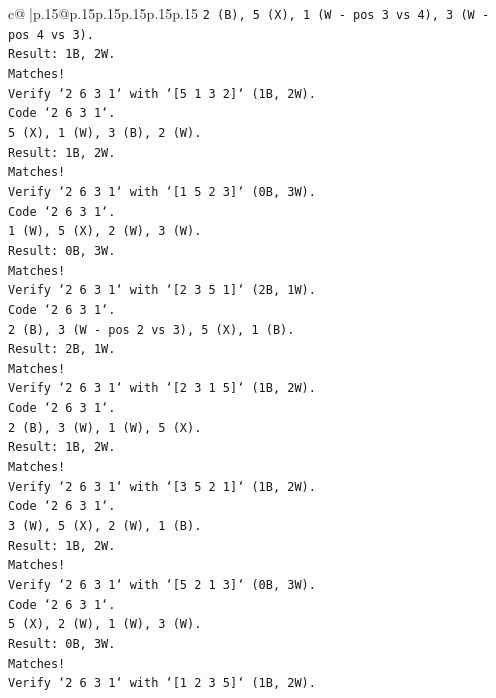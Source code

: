 \documentclass{article}
\begin{document}
{\begin{supertabular}{c@{$\;$}|p{.15\linewidth}@{}p{.15\linewidth}p{.15\linewidth}p{.15\linewidth}p{.15\linewidth}p{.15\linewidth}}
{{{\texttt{2 (B), 5 (X), 1 (W {-} pos 3 vs 4), 3 (W {-} pos 4 vs 3).} \\
\texttt{Result: 1B, 2W.} \\
\texttt{Matches!} \\
\texttt{Verify `2 6 3 1` with `{[}5 1 3 2{]}` (1B, 2W).} \\
\texttt{Code `2 6 3 1`.} \\
\texttt{5 (X), 1 (W), 3 (B), 2 (W).} \\
\texttt{Result: 1B, 2W.} \\
\texttt{Matches!} \\
\texttt{Verify `2 6 3 1` with `{[}1 5 2 3{]}` (0B, 3W).} \\
\texttt{Code `2 6 3 1`.} \\
\texttt{1 (W), 5 (X), 2 (W), 3 (W).} \\
\texttt{Result: 0B, 3W.} \\
\texttt{Matches!} \\
\texttt{Verify `2 6 3 1` with `{[}2 3 5 1{]}` (2B, 1W).} \\
\texttt{Code `2 6 3 1`.} \\
\texttt{2 (B), 3 (W {-} pos 2 vs 3), 5 (X), 1 (B).} \\
\texttt{Result: 2B, 1W.} \\
\texttt{Matches!} \\
\texttt{Verify `2 6 3 1` with `{[}2 3 1 5{]}` (1B, 2W).} \\
\texttt{Code `2 6 3 1`.} \\
\texttt{2 (B), 3 (W), 1 (W), 5 (X).} \\
\texttt{Result: 1B, 2W.} \\
\texttt{Matches!} \\
\texttt{Verify `2 6 3 1` with `{[}3 5 2 1{]}` (1B, 2W).} \\
\texttt{Code `2 6 3 1`.} \\
\texttt{3 (W), 5 (X), 2 (W), 1 (B).} \\
\texttt{Result: 1B, 2W.} \\
\texttt{Matches!} \\
\texttt{Verify `2 6 3 1` with `{[}5 2 1 3{]}` (0B, 3W).} \\
\texttt{Code `2 6 3 1`.} \\
\texttt{5 (X), 2 (W), 1 (W), 3 (W).} \\
\texttt{Result: 0B, 3W.} \\
\texttt{Matches!} \\
\texttt{Verify `2 6 3 1` with `{[}1 2 3 5{]}` (1B, 2W).} \\
}}}
\end{supertabular}}
\end{document}
